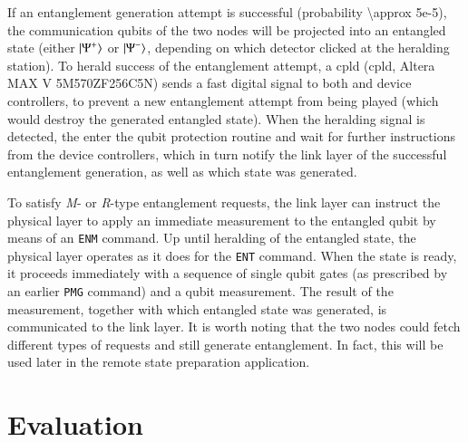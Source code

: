 If an entanglement generation attempt is successful (probability \num{\approx 5e-5}), the
communication qubits of the two nodes will be projected into an entangled state (either
$\ket{\Psi^+}$ or $\ket{\Psi^-}$, depending on which detector clicked at the heralding station). To
herald success of the entanglement attempt, a \acrshort{cpld} (\acrlong{cpld}, Altera MAX V
5M570ZF256C5N) sends a fast digital signal to both  and device controllers, to
prevent a new entanglement attempt from being played (which would destroy the generated entangled
state). When the heralding signal is detected, the  enter the qubit protection
routine and wait for further instructions from the device controllers, which in turn notify the link
layer of the successful entanglement generation, as well as which state was generated.

To satisfy \emph{M}- or \emph{R}-type entanglement requests, the link layer can instruct the
physical layer to apply an immediate measurement to the entangled qubit by means of an \texttt{ENM}
command. Up until heralding of the entangled state, the physical layer operates as it does for the
\texttt{ENT} command. When the state is ready, it proceeds immediately with a sequence of single
qubit gates (as prescribed by an earlier \texttt{PMG} command) and a qubit measurement. The result
of the measurement, together with which entangled state was generated, is communicated to the link
layer. It is worth noting that the two nodes could fetch different types of requests and still
generate entanglement. In fact, this will be used later in the remote state preparation application.

\section{Evaluation}
\label{sec:netstack:eval}

